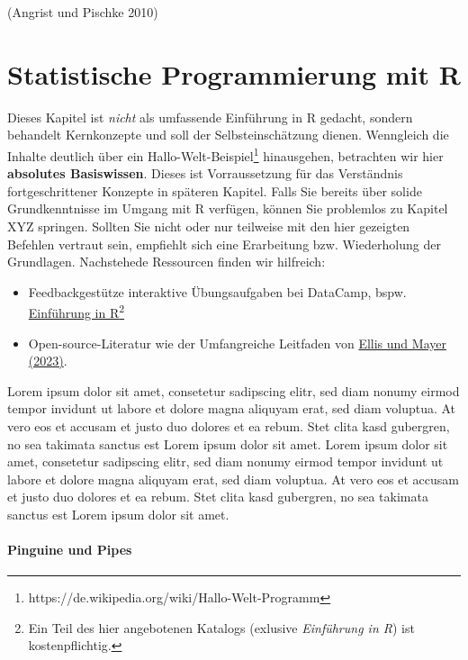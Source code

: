 \documentclass[
  letterpaper,
  DIV=11,
  oneside]{scrreprt}
\begin{document}
(Angrist und Pischke 2010)


\hypertarget{statistische-programmierung-mit-r}{%
\chapter{Statistische Programmierung mit
R}\label{statistische-programmierung-mit-r}}

Dieses Kapitel ist \emph{nicht} als umfassende Einführung in R gedacht,
sondern behandelt Kernkonzepte und soll der Selbsteinschätzung dienen.
Wenngleich die Inhalte deutlich über ein Hallo-Welt-Beispiel\footnote{https://de.wikipedia.org/wiki/Hallo-Welt-Programm}
hinausgehen, betrachten wir hier \textbf{absolutes Basiswissen}. Dieses
ist Vorraussetzung für das Verständnis fortgeschrittener Konzepte in
späteren Kapitel. Falls Sie bereits über solide Grundkenntnisse im
Umgang mit R verfügen, können Sie problemlos zu Kapitel XYZ springen.
Sollten Sie nicht oder nur teilweise mit den hier gezeigten Befehlen
vertraut sein, empfiehlt sich eine Erarbeitung bzw. Wiederholung der
Grundlagen. Nachstehede Ressourcen finden wir hilfreich:

\begin{itemize}
\item
  Feedbackgestütze interaktive Übungsaufgaben bei DataCamp, bspw.
  \href{https://campus.datacamp.com/courses/einfuhrung-in-r/}{Einführung
  in R}\footnote{Ein Teil des hier angebotenen Katalogs (exlusive
    \emph{Einführung in R}) ist kostenpflichtig.}
\item
  Open-source-Literatur wie der Umfangreiche Leitfaden von
  \href{https://methodenlehre.github.io/einfuehrung-in-R/}{Ellis und
  Mayer (2023)}.
\end{itemize}

Lorem ipsum dolor sit amet, consetetur sadipscing elitr, sed diam nonumy
eirmod tempor invidunt ut labore et dolore magna aliquyam erat, sed diam
voluptua. At vero eos et accusam et justo duo dolores et ea rebum. Stet
clita kasd gubergren, no sea takimata sanctus est Lorem ipsum dolor sit
amet. Lorem ipsum dolor sit amet, consetetur sadipscing elitr, sed diam
nonumy eirmod tempor invidunt ut labore et dolore magna aliquyam erat,
sed diam voluptua. At vero eos et accusam et justo duo dolores et ea
rebum. Stet clita kasd gubergren, no sea takimata sanctus est Lorem
ipsum dolor sit amet.

\hypertarget{pinguine-und-pipes}{%
\subsubsection{Pinguine und Pipes}\label{pinguine-und-pipes}}
\end{document}
